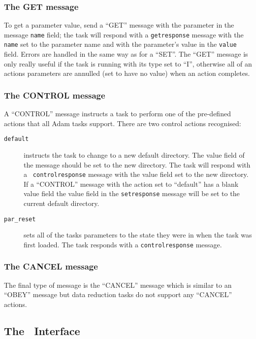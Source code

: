 \subsubsection{The GET message}

To get a parameter value, send a ``GET'' message with the parameter in the
message {\tt name} field; the task will respond with a {\tt getresponse} 
message with the {\tt name} set to the parameter name and with the
parameter's value in the {\tt value} field. Errors are handled in the same
way as for a ``SET''. The ``GET'' message is only really useful if the task
is running with its type set to ``I'', otherwise all of an actions parameters
are annulled (set to have no value) when an action completes.

\subsubsection{The CONTROL message}

A ``CONTROL'' message instructs a task to perform one of the pre-defined 
actions that all Adam tasks support. There are two control actions recognised:
\begin{description}
\item[{\tt default}] instructs the task to 
change to a new default directory. The value field of the message should 
be set to the new directory. The task will respond with a {\tt
controlresponse} message with the value field set to the new directory. 
If a ``CONTROL'' message with the action set to ``default'' has a blank value
field the value field in the {\tt setresponse} message will be set to the
current default directory.
\item[{\tt par\_reset}] sets all of the tasks parameters to the 
state they were in when the task was first loaded. The task responds with
a {\tt controlresponse} message.
\end{description}

\subsubsection{The CANCEL message}
The final type of message is the ``CANCEL'' message which is similar to an
``OBEY'' message but data reduction tasks do not support any ``CANCEL'' 
actions.

\subsection{\label{tcltk_interface}The \TclTk\ Interface}


